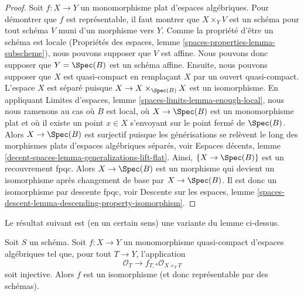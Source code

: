 \begin{proof}
Soit $f : X \to Y$ un monomorphisme plat d'espaces algébriques.
Pour démontrer que $f$ est représentable, il faut montrer que
$X \times_Y V$ est un schéma pour tout schéma $V$ muni d'un morphisme vers $Y$.
Comme la propriété d'être un schéma est locale (Propriétés des espaces,
lemme \ref{spaces-properties-lemma-subscheme}), nous pouvons
supposer que $V$ est affine. Nous pouvons donc supposer que $Y = \Spec(B)$
est un schéma affine. Ensuite, nous pouvons supposer que $X$ est quasi-compact
en remplaçant $X$ par un ouvert quasi-compact. L'espace $X$ est
séparé puisque $X \to X \times_{\Spec(B)} X$ est un isomorphisme.
En appliquant Limites d'espaces, lemme \ref{spaces-limits-lemma-enough-local},
nous nous ramenons au cas où $B$ est local, où $X \to \Spec(B)$ est un
monomorphisme plat et où
il existe un point $x \in X$ s'envoyant sur le point fermé de $\Spec(B)$.
Alors $X \to \Spec(B)$ est surjectif puisque les générisations
se relèvent le long des morphismes plats d'espaces algébriques séparés, voir
Espaces décents, lemme \ref{decent-spaces-lemma-generalizations-lift-flat}.
Ainsi, $\{X \to \Spec(B)\}$ est un recouvrement fpqc.
Alors $X \to \Spec(B)$ est un morphisme qui devient un isomorphisme
après changement de base par $X \to \Spec(B)$. Il est donc un isomorphisme par
descente fpqc, voir Descente sur les espaces, lemme
\ref{spaces-descent-lemma-descending-property-isomorphism}.
\end{proof}

\noindent
Le résultat suivant est (en un certain sens) une variante du lemme ci-dessus.

\begin{lemma}
\label{lemma-ui-case}
Soit $S$ un schéma. Soit $f : X \to Y$ un monomorphisme quasi-compact
d'espaces algébriques tel que, pour tout $T \to Y$, l'application
$$
\mathcal{O}_T \to f_{T,*}\mathcal{O}_{X \times_Y T}
$$
soit injective. Alors $f$ est un isomorphisme (et donc représentable par des schémas).
\end{lemma}

